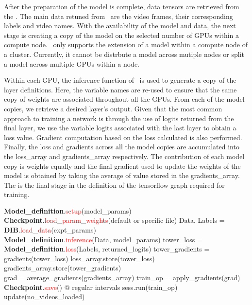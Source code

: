 \documentclass{llncs}
\begin{document}
After the preparation of the model is complete, data tensors are retrieved from the \data.
The main data retuned from \data~are the video frames, their corresponding labels and video names.
With the availability of the model and data, the next stage is creating a copy of the model on the selected number of GPUs within a compute node.
\acro~only supports the extension of a model within a compute node of a cluster. 
Currently, it cannot be distrbute a model across mutiple nodes or split a model across multiple GPUs within a node.

Within each GPU, the inference function of \model~is used to generate a copy of the layer definitions. 
Here, the variable names are re-used to ensure that the same copy of weights are associated throughout all the GPUs.
From each of the model copies, we retrieve a desired layer's output. 
Given that the most common approach to training a network is through the use of logits returned from the final layer, we use the variable logits associated with the last layer to obtain a loss value.
Gradient computation based on the loss calculated is also performed.
Finally, the loss and gradients across all the model copies are accumulated into the loss\_array and gradients\_array respectively.
The contribution of each model copy is weights equally and the final gradient used to update the weights of the model is obtained by taking the average of value stored in the gradients\_array.
The is the final stage in the definition of the tensorflow graph required for training.

\begin{algorithmic}[H]
\State \textbf{Model\_definition}.\textcolor{red}{setup}(model\_params)
\State \textbf{Checkpoint}.\textcolor{red}{load\_param\_weights}(default or specific file)
\State Data, Labels = \textbf{DIB}.\textcolor{red}{load\_data}(expt\_params)
\\
\State \textbf{Model\_definition}.\textcolor{red}{inference}(Data, model\_params)
\State tower\_loss = \textbf{Model\_definition}.\textcolor{red}{loss}(Labels, returned\_logits)
\State tower\_gradients = gradients(tower\_loss)
\State loss\_array.store(tower\_loss)
\State gradients\_array.store(tower\_gradients)
\EndFor
\\
\State grad = average\_gradients(gradients\_array)
\State train\_op = apply\_gradients(grad)
\\
\State \textbf{Checkpoint}.\textcolor{red}{save}() @ regular intervals
\State sess.run(train\_op)
\State update(no\_videos\_loaded)
\EndWhile
\EndProcedure
\end{algorithmic}
\end{document}
